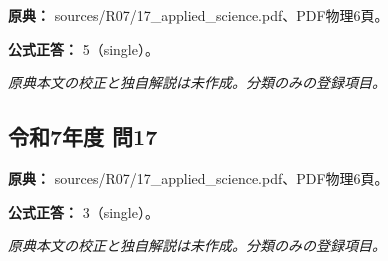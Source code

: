 \noindent\textbf{原典：} sources/R07/17\_applied\_science.pdf、PDF物理6頁。

\textbf{公式正答：} 5（single）。

\par\textit{原典本文の校正と独自解説は未作成。分類のみの登録項目。}

\subsection{令和7年度 問17}
\label{q:r07-reg-applied-17}

\noindent\textbf{原典：} sources/R07/17\_applied\_science.pdf、PDF物理6頁。

\textbf{公式正答：} 3（single）。

\par\textit{原典本文の校正と独自解説は未作成。分類のみの登録項目。}
